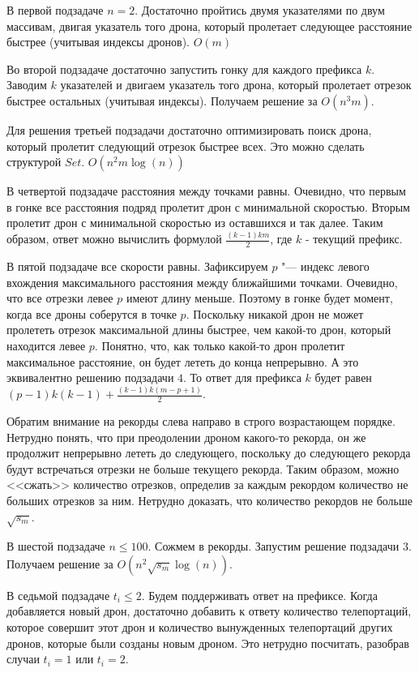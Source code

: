 \ifdefined\tutorialbox {} \fi

В первой подзадаче $n=2$. Достаточно пройтись двумя указателями по двум массивам, двигая указатель того дрона, который пролетает следующее расстояние быстрее (учитывая индексы дронов). $O(m)$

Во второй подзадаче достаточно запустить гонку для каждого префикса $k$. Заводим $k$ указателей и двигаем указатель того дрона, который пролетает отрезок быстрее остальных (учитывая индексы). Получаем решение за $O(n^3 m)$.

Для решения третьей подзадачи достаточно оптимизировать поиск дрона, который пролетит следующий отрезок быстрее всех. Это можно сделать структурой $Set$. $O(n^2 m \log(n))$

В четвертой подзадаче расстояния между точками равны. Очевидно, что первым в гонке все расстояния подряд пролетит дрон с минимальной скоростью. Вторым пролетит дрон с минимальной скоростью из оставшихся и так далее. Таким образом, ответ можно вычислить формулой $\frac{(k-1) k m}{2}$, где $k$ - текущий префикс. 

В пятой подзадаче все скорости равны. Зафиксируем $p$ "--- индекс левого вхождения максимального расстояния между ближайшими точками. Очевидно, что все отрезки левее $p$ имеют длину меньше. Поэтому в гонке будет момент, когда все дроны соберутся в точке $p$. Поскольку никакой дрон не может пролететь отрезок максимальной длины быстрее, чем какой-то дрон, который находится левее $p$. Понятно, что, как только какой-то дрон пролетит максимальное расстояние, он будет лететь до конца непрерывно. А это эквивалентно решению подзадачи $4$. То ответ для префикса $k$ будет равен $(p-1) k (k-1) + \frac{(k-1) k (m-p+1)}{2}$.

Обратим внимание на рекорды слева направо в строго возрастающем порядке. Нетрудно понять, что при преодолении дроном какого-то рекорда, он же продолжит непрерывно лететь до следующего, поскольку до следующего рекорда будут встречаться отрезки не больше текущего рекорда. Таким образом, можно <<сжать>> количество отрезков, определив за каждым рекордом количество не больших отрезков за ним. Нетрудно доказать, что количество рекордов не больше $\sqrt{s_m}$.


В шестой подзадаче $n \le 100$. Сожмем в рекорды. Запустим решение подзадачи $3$. Получаем решение за $O(n^2 \sqrt{s_m} \log(n))$.

В седьмой подзадаче $t_i \le 2$. Будем поддерживать ответ на префиксе. Когда добавляется новый дрон, достаточно добавить к ответу количество телепортаций, которое совершит этот дрон и количество вынужденных телепортаций других дронов, которые были созданы новым дроном. Это нетрудно посчитать, разобрав случаи $t_i = 1$ или $t_i = 2$. 

